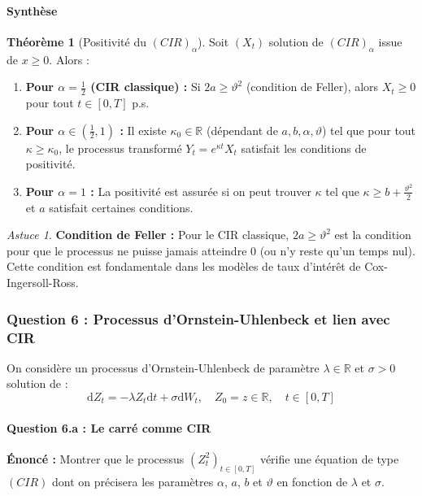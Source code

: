 \documentclass[12pt,a4paper]{article}
\theoremstyle{definition}
\newtheorem{theorem}{Théorème}[section]
\theoremstyle{remark}
\newtheorem*{astuce}{Astuce}
\newcommand{\R}{\mathbb{R}}
\newcommand{\dd}{\mathrm{d}}
\begin{document}
\paragraph{Synthèse}

\begin{theorem}[Positivité du $(CIR)_\alpha$]
Soit $(X_t)$ solution de $(CIR)_\alpha$ issue de $x \geq 0$. Alors :
\begin{enumerate}[label=(\alph*)]
\item \textbf{Pour $\alpha = \frac{1}{2}$ (CIR classique) :} Si $2a \geq \vartheta^2$ (condition de Feller), alors $X_t \geq 0$ pour tout $t \in [0,T]$ p.s.

\item \textbf{Pour $\alpha \in (\frac{1}{2}, 1)$ :} Il existe $\kappa_0 \in \R$ (dépendant de $a, b, \alpha, \vartheta$) tel que pour tout $\kappa \geq \kappa_0$, le processus transformé $Y_t = e^{\kappa t}X_t$ satisfait les conditions de positivité.

\item \textbf{Pour $\alpha = 1$ :} La positivité est assurée si on peut trouver $\kappa$ tel que $\kappa \geq b + \frac{\vartheta^2}{2}$ et $a$ satisfait certaines conditions.
\end{enumerate}
\end{theorem}

\begin{astuce}
\textbf{Condition de Feller :} Pour le CIR classique, $2a \geq \vartheta^2$ est la condition pour que le processus ne puisse jamais atteindre $0$ (ou n'y reste qu'un temps nul). Cette condition est fondamentale dans les modèles de taux d'intérêt de Cox-Ingersoll-Ross.
\end{astuce}

\subsubsection{Question 6 : Processus d'Ornstein-Uhlenbeck et lien avec CIR}

On considère un processus d'Ornstein-Uhlenbeck de paramètre $\lambda \in \R$ et $\sigma > 0$ solution de :
\[
\dd Z_t = -\lambda Z_t \dd t + \sigma \dd W_t, \quad Z_0 = z \in \R, \quad t \in [0,T]
\]

\paragraph{Question 6.a : Le carré comme CIR}

\textbf{Énoncé :} Montrer que le processus $(Z_t^2)_{t \in [0,T]}$ vérifie une équation de type $(CIR)$ dont on précisera les paramètres $\alpha$, $a$, $b$ et $\vartheta$ en fonction de $\lambda$ et $\sigma$.
\end{document}
